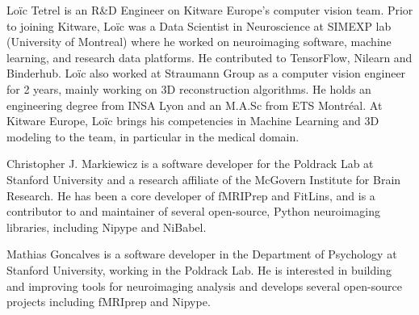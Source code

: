 \documentclass[lettersize,journal]{IEEEtran}
\begin{document}
{\begin{IEEEbiography}{Loïc Tetrel}
  is an R\&D Engineer on Kitware Europe’s computer vision team.
  Prior to joining Kitware, Loïc was a Data Scientist in Neuroscience at SIMEXP lab (University of Montreal) where he worked on neuroimaging software, machine learning, and research data platforms. He contributed to TensorFlow, Nilearn and Binderhub. Loïc also worked at Straumann Group as a computer vision engineer for 2 years, mainly working on 3D reconstruction algorithms.
  He holds an engineering degree from INSA Lyon and an M.A.Sc from ETS Montréal.
  At Kitware Europe, Loïc brings his competencies in Machine Learning and 3D modeling to the team, in particular in the medical domain.
\end{IEEEbiography}

\begin{IEEEbiography}{Christopher J. Markiewicz}
  is a software developer for the Poldrack Lab at Stanford University and a research affiliate of the McGovern Institute for Brain Research. He has been a core developer of fMRIPrep and FitLins, and is a contributor to and maintainer of several open-source, Python neuroimaging libraries, including Nipype and NiBabel.
\end{IEEEbiography}


\begin{IEEEbiography}{Mathias Goncalves}
  is a software developer in the Department of Psychology at Stanford University, working in the Poldrack Lab. He is interested in building and improving tools for neuroimaging analysis and develops several open-source projects including fMRIprep and Nipype.
\end{IEEEbiography}

}
\end{document}
